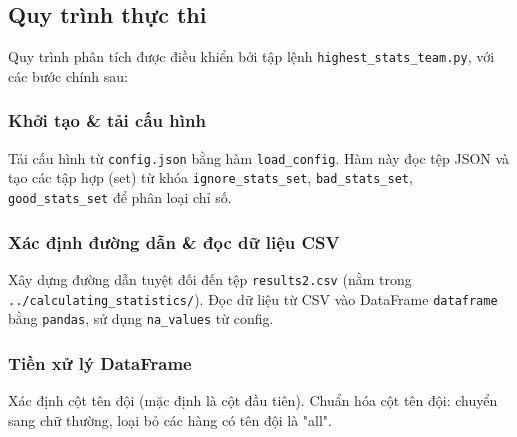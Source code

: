 \documentclass[12pt, a4paper]{report}
\begin{document}
\subsection{Quy trình thực thi}
Quy trình phân tích được điều khiển bởi tập lệnh \texttt{highest\_stats\_team.py}, với các bước chính sau:
\subsubsection*{Khởi tạo \& tải cấu hình}
Tải cấu hình từ \texttt{config.json} bằng hàm \texttt{load\_config}. Hàm này đọc tệp JSON và tạo các tập hợp (set) từ khóa \texttt{ignore\_stats\_set}, \texttt{bad\_stats\_set}, \texttt{good\_stats\_set} để phân loại chỉ số.

\subsubsection*{Xác định đường dẫn \& đọc dữ liệu CSV}
Xây dựng đường dẫn tuyệt đối đến tệp \texttt{results2.csv} (nằm trong \sloppypar
\texttt{../calculating\_statistics/}).
Đọc dữ liệu từ CSV vào DataFrame \texttt{dataframe} bằng \texttt{pandas}, sử dụng \texttt{na\_values} từ config.

\subsubsection*{Tiền xử lý DataFrame}
Xác định cột tên đội (mặc định là cột đầu tiên).
Chuẩn hóa cột tên đội: chuyển sang chữ thường, loại bỏ các hàng có tên đội là "all".
\end{document}
